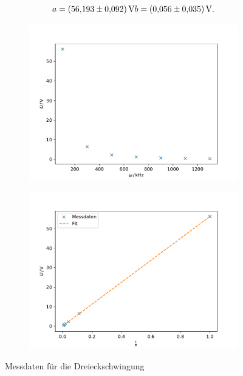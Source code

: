 \begin{align*}
    a = \SI{56.193 \pm 0.092}{V}
    b = \SI{0.056 \pm 0.035}{V} .
\end{align*}
\begin{figure}[h]
    \begin{subfigure}{0.5\textwidth}
        \centering
        \includegraphics[width=\textwidth]{assets/dreieck_messung.pdf}
    \end{subfigure}
    \begin{subfigure}{0.5\textwidth}
        \centering
        \includegraphics[width=\textwidth]{assets/dreieck_fit.pdf}
    \end{subfigure}
    \caption{Messdaten für die Dreieckschwingung}
    \label{fig:dreieck_fit}
\end{figure}
